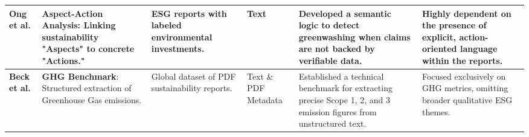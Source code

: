 \begin{landscape}
\begin{table}[p]
\begin{tabularx}{\linewidth}{|p{1.8cm}|p{3.5cm}|p{3.5cm}|p{1.8cm}|X|X|}
\textbf{Ong et al.}  \parencite{keane_ong_369a0b63} & \textbf{Aspect-Action Analysis}: Linking sustainability "Aspects" to concrete "Actions." & ESG reports with labeled environmental investments. & Text & Developed a semantic logic to detect greenwashing when claims are not backed by verifiable data. & Highly dependent on the presence of explicit, action-oriented language within the reports. \\ \hline
\textbf{Beck et al.}  \parencite{jacob_beck_9548a833} & \textbf{GHG Benchmark}: Structured extraction of Greenhouse Gas emissions. & Global dataset of PDF sustainability reports. & Text \& PDF Metadata & Established a technical benchmark for extracting precise Scope 1, 2, and 3 emission figures from unstructured text. & Focused exclusively on GHG metrics, omitting broader qualitative ESG themes. \\ \hline
\end{tabularx}
\end{table}
\end{landscape}


